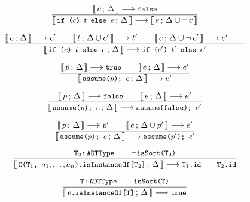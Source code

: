 \documentclass[a4paper,twoside]{article}
\newcommand{\lb}[2]{\llbracket\, #1\,;\, #2\, \rrbracket}
\newcommand{\stt}[1]{\texttt{\small{#1}}}
\begin{document}
\begin{figure}[htb]
\begin{framed}
\begin{equation}
\dfrac{
  \lb{c}{\Delta} \longrightarrow \stt{false}
}{
  \lb{\stt{if ($c$) $t$ else $e$}}{\Delta} \longrightarrow \lb{e}{\Delta \cup \neg \,c}
}
\end{equation}


\begin{equation}
\dfrac{
  \lb{c}{\Delta} \longrightarrow c' \qquad
  \lb{t}{\Delta \cup c'} \longrightarrow t' \qquad
  \lb{e}{\Delta \cup \neg\, c'} \longrightarrow e' \qquad
}{
  \lb{\stt{if ($c$) $t$ else $e$}}{\Delta} \longrightarrow \stt{if ($c'$) $t'$ else $e'$}
}
\end{equation}

\begin{equation}
\dfrac{
  \lb{p}{\Delta} \longrightarrow \stt{true} \qquad
  \lb{e}{\Delta} \longrightarrow e'
}{
  \lb{\stt{assume($p$); $e$}}{\Delta} \longrightarrow e'
}
\end{equation}

\begin{equation}
\dfrac{
  \lb{p}{\Delta} \longrightarrow \stt{false} \qquad
  \lb{e}{\Delta} \longrightarrow e'
}{
  \lb{\stt{assume($p$); $e$}}{\Delta} \longrightarrow \stt{assume(false); $e'$}
}
\end{equation}

\begin{equation}
\dfrac{
  \lb{p}{\Delta} \longrightarrow p' \qquad
  \lb{e}{\Delta \cup p'} \longrightarrow e'
}{
  \lb{\stt{assume($p$); $e$}}{\Delta} \longrightarrow
  \stt{assume($p'$); $e'$}
}
\end{equation}

\begin{equation}
\dfrac{
  \stt{T$_2$:\,ADTType} \qquad
  \neg \stt{isSort(T$_2$)}
}{
  \lb{\stt{C(T$_1$, $a_1, \ldots, a_n$).isInstanceOf[T$_2$]}}{\Delta}
  \longrightarrow \stt{T$_1$.id == T$_2$.id}
}
\end{equation}

\begin{equation}
\dfrac{
  \stt{T:\,ADTType} \qquad
  \stt{isSort(T)}
}{
  \lb{\stt{$e$.isInstanceOf[T]}}{\Delta} \longrightarrow \stt{true}
}
\end{equation}


\end{framed}
\end{figure}
\end{document}
